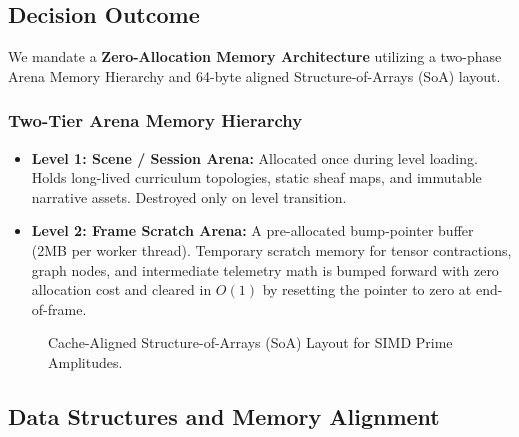 \subsection{Decision Outcome}
We mandate a \textbf{Zero-Allocation Memory Architecture} utilizing a two-phase Arena Memory Hierarchy and 64-byte aligned Structure-of-Arrays (SoA) layout.

\subsubsection{Two-Tier Arena Memory Hierarchy}
\begin{itemize}
    \item \textbf{Level 1: Scene / Session Arena:} Allocated once during level loading. Holds long-lived curriculum topologies, static sheaf maps, and immutable narrative assets. Destroyed only on level transition.
    \item \textbf{Level 2: Frame Scratch Arena:} A pre-allocated bump-pointer buffer (2MB per worker thread). Temporary scratch memory for tensor contractions, graph nodes, and intermediate telemetry math is bumped forward with zero allocation cost and cleared in $O(1)$ by resetting the pointer to zero at end-of-frame.
\end{itemize}

\begin{figure}[htbp]
\centering
{}
\caption{Cache-Aligned Structure-of-Arrays (SoA) Layout for SIMD Prime Amplitudes.}
\label{fig:cache_layout}
\end{figure}

\subsection{Data Structures and Memory Alignment}

